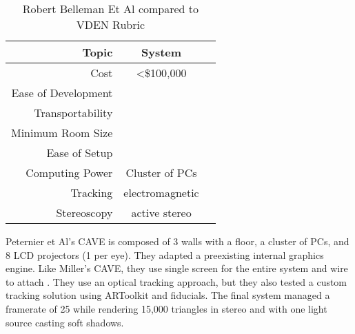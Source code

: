 \filbreak
{}

\begin{table}[H]
	\centering
	\renewcommand\arraystretch{0.5}
	\begin{tabular}{r|c|c}
		\hline 
		Topic 				& System 				&  \\ 
		\hline 
		Cost 				& \textless \$100,000 	& \cross \\ 
		Ease of Development & \ns 					& \cross \\ 
		Transportability 	& \ns  					& \cross \\ 
		Minimum Room Size 	& \ns 					& \cross \\ 
		Ease of Setup 		& \ns 					& \cross \\ 
		Computing Power 	& Cluster of PCs 		& \cross \\ 
		Tracking 			& electromagnetic 		& \cross \\ 
		Stereoscopy 		& active stereo 		& \checkmark \\ 
		\hline 
	\end{tabular} 
	
	\caption{Robert Belleman Et Al compared to VDEN Rubric} \label{tab:stifdsamuli}
\end{table}

Peternier et Al's CAVE is composed of 3 walls with a floor, a cluster of PCs, and 8 LCD projectors (1 per eye). They adapted a preexisting internal graphics engine. Like Miller's CAVE, they use single screen for the entire system and wire to attach \cite{miller}. They use an optical tracking approach, but they also tested a custom tracking solution using ARToolkit and fiducials. The final system managed a framerate of 25 while rendering 15,000 triangles in stereo and with one light source casting soft shadows.



\filbreak
{}

